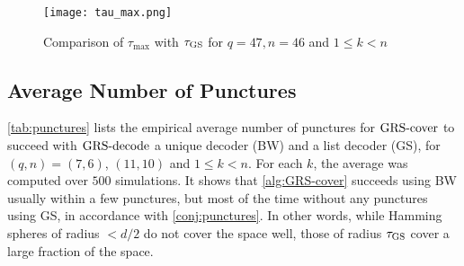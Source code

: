 \documentclass[conference]{IEEEtran}
\begin{document}
\begin{figure}[!htbp]
    \centering
    \texttt{[image: tau\_max.png]}
    \caption{Comparison of $\tau_{\max}$ with $\tau_{\operatorname{GS}}$ for $q = 47, n = 46$ and $1 \le k < n$}
    \label{fig:comparison}
\end{figure}

\subsection{Average Number of Punctures}

\autoref{tab:punctures} lists the empirical average number of punctures for $\operatorname{GRS-cover}$ to succeed with $\operatorname{GRS-decode}$ a unique decoder (BW) and a list decoder (GS), %
for $(q, n) = (7, 6)$, $(11, 10)$ and $1 \le k < n$. For each $k$, the average was computed over $500$ simulations. 
It shows that \autoref{alg:GRS-cover} succeeds using BW usually within a few punctures, but most of the time without any punctures using GS, in accordance with \autoref{conj:punctures}. 
In other words, while Hamming spheres of radius $< d / 2$ do not cover the space well, those of radius $\tau_{\operatorname{GS}}$ cover a large fraction of the space. 
\end{document}
